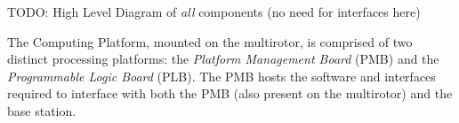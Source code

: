 TODO: High Level Diagram of \textit{all} components (no need for interfaces here)

The Computing Platform, mounted on the multirotor, is comprised of two distinct processing platforms: the \textit{Platform Management Board} (PMB) and the \textit{Programmable Logic Board} (PLB). The PMB hosts the software and interfaces required to interface with both the PMB (also present on the multirotor) and the base station.
